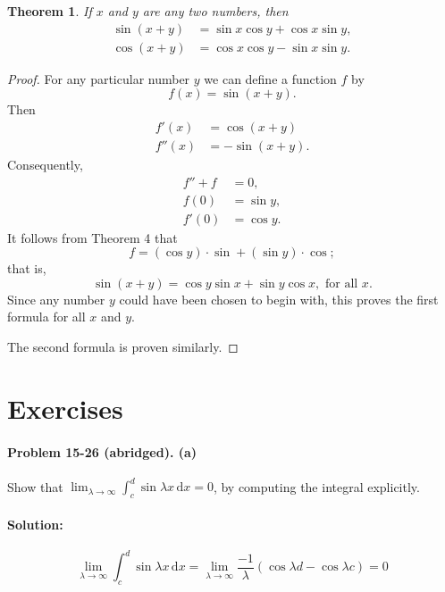 \documentclass{article}
\newtheorem{theorem}{Theorem}
\begin{document}
\begin{theorem}
  If $x$ and $y$ are any two numbers, then \begin{align*}
    \sin(x + y) &= \sin x \cos y + \cos x \sin y, \\
    \cos(x + y) &= \cos x \cos y - \sin x \sin y.
  \end{align*}
\end{theorem}

\begin{proof}
  For any particular number $y$ we can define a function $f$ by
  \begin{equation*}
    f(x) = \sin(x + y).
  \end{equation*} Then \begin{align*}
    f'(x) &= \cos(x + y) \\
    f''(x) &= -\sin(x + y).
  \end{align*} Consequently, \begin{align*}
    f'' + f &= 0, \\
    f(0) &= \sin y, \\
    f'(0) &= \cos y.
  \end{align*} It follows from Theorem 4 that \begin{equation*}
    f = (\cos y ) \cdot \sin{} + (\sin y) \cdot \cos{};
  \end{equation*} that is, \begin{equation*}
    \sin(x + y) = \cos y \sin x + \sin y \cos x, \text{ for all } x.
  \end{equation*} Since any number $y$ could have been chosen to begin with,
  this proves the first formula for all $x$ and $y$.

  The second formula is proven similarly.
\end{proof}

\section*{Exercises}

\paragraph{Problem 15-26 (abridged). (a)} Show that
$\lim_{\lambda \rightarrow \infty} \int_c^d \sin \lambda x \,\mathrm{d}x = 0$,
by computing the integral explicitly.

\paragraph{Solution:} \begin{equation*}
\lim_{\lambda \rightarrow \infty} \int_c^d \sin \lambda x \,\mathrm{d}x
= \lim_{\lambda \rightarrow \infty} \frac{-1}{\lambda}(\cos \lambda d -
\cos \lambda c) = 0
\end{equation*}
\end{document}
